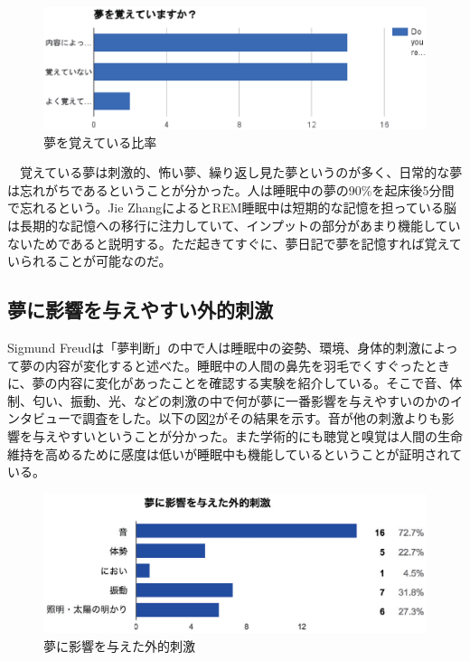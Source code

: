 \begin{figure}[htbp]
\begin{center}
\includegraphics[width=15cm]{eps/remember.eps}
\caption{夢を覚えている比率}
\label{rememberDream}
\end{center}
\end{figure}

　覚えている夢は刺激的、怖い夢、繰り返し見た夢というのが多く、日常的な夢は忘れがちであるということが分かった。人は睡眠中の夢の90\%を起床後5分間で忘れるという。Jie ZhangによるとREM睡眠中は短期的な記憶を担っている脳は長期的な記憶への移行に注力していて、インプットの部分があまり機能していないためであると説明する。ただ起きてすぐに、夢日記で夢を記憶すれば覚えていられることが可能なのだ\cite{forgetDreams}。

\subsection{夢に影響を与えやすい外的刺激}
Sigmund Freudは「夢判断」の中で人は睡眠中の姿勢、環境、身体的刺激によって夢の内容が変化すると述べた\cite{freud}。睡眠中の人間の鼻先を羽毛でくすぐったときに、夢の内容に変化があったことを確認する実験を紹介している。そこで音、体制、匂い、振動、光、などの刺激の中で何が夢に一番影響を与えやすいのかのインタビューで調査をした。以下の図\ref{externalShigeki}がその結果を示す。音が他の刺激よりも影響を与えやすいということが分かった。また学術的にも聴覚と嗅覚は人間の生命維持を高めるために感度は低いが睡眠中も機能しているということが証明されている\cite{Zhang}。

\begin{figure}[htbp]
\begin{center}
\includegraphics[width=15cm]{eps/input.eps}
\caption{夢に影響を与えた外的刺激}
\label{externalShigeki}
\end{center}
\end{figure}

